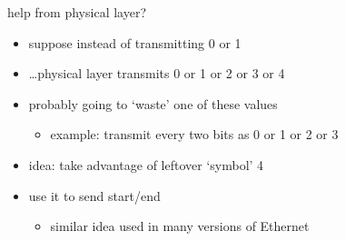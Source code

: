 \begin{frame}{help from physical layer?}
    \begin{itemize}
    \item suppose instead of transmitting 0 or 1
    \item \ldots physical layer transmits 0 or 1 or 2 or 3 or 4
    \item probably going to `waste' one of these values
        \begin{itemize}
        \item example: transmit every two bits as 0 or 1 or 2 or 3
        \end{itemize}
    \vspace{.5cm}
    \item<2-> idea: take advantage of leftover `symbol' 4
    \item<2-> use it to send start/end
        \begin{itemize}
        \item similar idea used in many versions of Ethernet
        \end{itemize}
    \end{itemize}
\end{frame}
